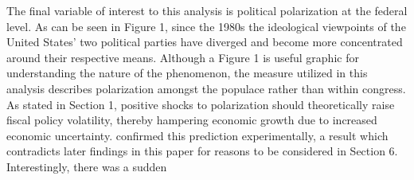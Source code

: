 \documentclass[a4paper, 12pt]{article}
\begin{document}
The final variable of interest to this analysis is political polarization at the federal level. As can be seen in Figure 1, since the 1980s the ideological viewpoints of the United States' two political parties have diverged and become more concentrated around their respective means\cite{mccarty2006, bonicaRosenthal2013}. Although a Figure 1 is useful graphic for understanding the nature of the phenomenon, the measure utilized in this analysis describes polarization amongst the populace rather than within congress. As stated in Section 1, positive shocks to polarization should theoretically raise fiscal policy volatility, thereby hampering economic growth due to increased economic uncertainty\cite{azzimontiTalbert2014, bakerBloomDavis2016}.  confirmed this prediction experimentally, a result which contradicts later findings in this paper for reasons to be considered in Section 6. Interestingly, there was a sudden \par 
\end{document}
